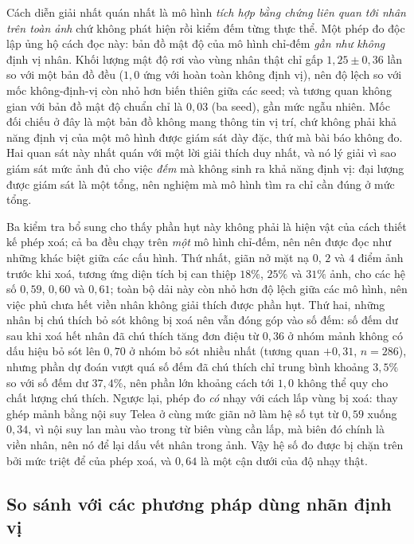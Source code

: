 \documentclass[preprint,12pt]{elsarticle}
\begin{document}
Cách diễn giải nhất quán nhất là mô hình \emph{tích hợp bằng chứng liên quan tới nhân trên toàn ảnh} chứ không
phát hiện rồi kiểm đếm từng thực thể. Một phép đo độc lập ủng hộ cách đọc này: bản đồ mật độ của mô hình chỉ-đếm
\emph{gần như không} định vị nhân. Khối lượng mật độ rơi vào vùng nhân thật chỉ gấp $1{,}25\pm0{,}36$ lần so với
một bản đồ đều ($1{,}0$ ứng với hoàn toàn không định vị), nên độ lệch so với mốc không-định-vị còn nhỏ hơn biến
thiên giữa các seed; và tương quan không gian với bản đồ mật độ chuẩn chỉ là $0{,}03$ (ba seed), gần mức ngẫu
nhiên. Mốc đối chiếu ở đây là một bản đồ không mang thông tin vị trí, chứ không phải khả năng định vị của một mô
hình được giám sát dày đặc, thứ mà bài báo không đo. Hai quan sát này nhất quán với một lời giải thích duy nhất,
và nó lý giải vì sao giám sát mức ảnh đủ cho việc \emph{đếm} mà không sinh ra khả năng định vị: đại lượng được
giám sát là một tổng, nên nghiệm mà mô hình tìm ra chỉ cần đúng ở mức tổng.

Ba kiểm tra bổ sung cho thấy phần hụt này không phải là hiện vật của cách thiết kế phép xoá; cả ba đều chạy trên
\emph{một} mô hình chỉ-đếm, nên nên được đọc như những khác biệt giữa các cấu hình. Thứ nhất, giãn nở mặt nạ $0$,
$2$ và $4$ điểm ảnh trước khi xoá, tương ứng diện tích bị can thiệp $18\%$, $25\%$ và $31\%$ ảnh, cho các hệ số
$0{,}59$, $0{,}60$ và $0{,}61$; toàn bộ dải này còn nhỏ hơn độ lệch giữa các mô hình, nên việc phủ chưa hết viền
nhân không giải thích được phần hụt. Thứ hai, những nhân bị chú thích bỏ sót không bị xoá nên vẫn đóng góp vào số
đếm: số đếm dư sau khi xoá hết nhân đã chú thích tăng đơn điệu từ $0{,}36$ ở nhóm mảnh không có dấu hiệu bỏ sót
lên $0{,}70$ ở nhóm bỏ sót nhiều nhất (tương quan $+0{,}31$, $n = 286$), nhưng phần dự đoán vượt quá số đếm đã chú
thích chỉ trung bình khoảng $3{,}5\%$ so với số đếm dư $37{,}4\%$, nên phần lớn khoảng cách tới $1{,}0$ không thể
quy cho chất lượng chú thích. Ngược lại, phép đo \emph{có} nhạy với cách lấp vùng bị xoá: thay ghép mảnh bằng nội
suy Telea ở cùng mức giãn nở làm hệ số tụt từ $0{,}59$ xuống $0{,}34$, vì nội suy lan màu vào trong từ biên vùng
cần lấp, mà biên đó chính là viền nhân, nên nó để lại dấu vết nhân trong ảnh. Vậy hệ số đo được bị chặn trên bởi
mức triệt để của phép xoá, và $0{,}64$ là một cận dưới của độ nhạy thật.

\subsection{So sánh với các phương pháp dùng nhãn định vị}\label{sec:paradigm}
\end{document}

